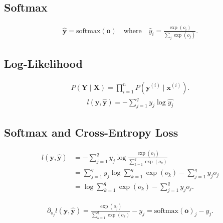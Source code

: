 \documentclass[a4paper,12pt]{article}
\theoremstyle{definition}
\begin{document}
    \subsection*{Softmax}
    \begin{equation*}
        \begin{aligned}
            \hat{\mathbf{y}} = \mathrm{softmax}(\mathbf{o}) \quad \text{where} \quad \hat{y}_i = \frac{\exp(o_i)}{\sum_j \exp(o_j)}.
        \end{aligned}
    \end{equation*}

    \subsection*{Log-Likelihood}
    \begin{equation*}
        \begin{aligned}
            P(\mathbf{Y} \mid \mathbf{X}) = \prod_{i=1}^n P(\mathbf{y}^{(i)} \mid \mathbf{x}^{(i)}).
        \end{aligned}
    \end{equation*}
    \begin{equation*}
        \begin{aligned}
            l(\mathbf{y},\mathbf{\hat{y}}) = -\sum_{j=1}^{q}y_j \log \hat{y_j}
        \end{aligned}
    \end{equation*}

    \subsection*{Softmax and Cross-Entropy Loss}
    \begin{equation*}
        \begin{aligned}
            l(\mathbf{y}, \hat{\mathbf{y}}) &=  - \sum_{j=1}^q y_j \log \frac{\exp(o_j)}{\sum_{k=1}^q \exp(o_k)} \\
            &= \sum_{j=1}^q y_j \log \sum_{k=1}^q \exp(o_k) - \sum_{j=1}^q y_j o_j \\
            &= \log \sum_{k=1}^q \exp(o_k) - \sum_{j=1}^q y_j o_j.
        \end{aligned}
    \end{equation*}

    \begin{equation*}
        \begin{aligned}
            \partial_{o_j} l(\mathbf{y}, \hat{\mathbf{y}}) = \frac{\exp(o_j)}{\sum_{k=1}^q \exp(o_k)} - y_j = \mathrm{softmax}(\mathbf{o})_j - y_j.
        \end{aligned}
    \end{equation*}
\end{document}
